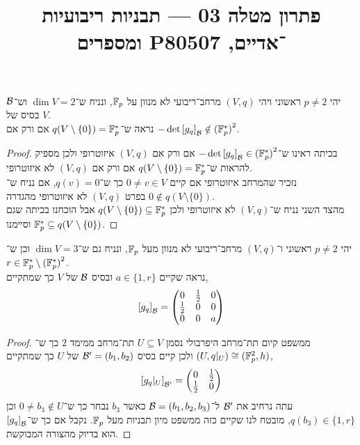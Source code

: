 
\title{פתרון מטלה 03 --- תבניות ריבועיות ומספרים P־אדיים, 80507}

\DeclareMathOperator{\rank}{rank}



\maketitle
\maketitleprint[red]

\question{}
יהי $p \ne 2$ ראשוני ויהי $(V, q)$ מרחב־ריבועי לא מנוון על $\mathbb{F}_p$, ונניח ש־$\dim V = 2$ וש־$\mathcal{B}$ בסיס של $V$. \\
נראה ש־$q(V \setminus \{ 0 \}) = \mathbb{F}_p^*$ אם ורק אם $-\det{[g_q]}_{\mathcal{B}} \notin {(\mathbb{F}_p^*)}^2$.
\begin{proof}
	בכיתה ראינו ש־$- \det {[g_q]}_{\mathcal{B}} \in {(\mathbb{F}_p^*)}^2$ אם ורק אם $(V, q)$ איזוטרופי ולכן מספיק להראות ש־$q(V \setminus \{ 0 \}) = \mathbb{F}_p^*$ אם ורק אם $(V, q)$ לא איזוטרופי. \\
	נזכיר שהמרחב איזוטרופי אם קיים $0 \ne v \in V$ כך ש־$q(v) = 0$, אם נניח ש־$0 \notin q(V \setminus \{ 0 \})$ בפרט $(V, q)$ לא איזוטרופי מהגדרה. \\
	מהצד השני נניח ש־$(V, q)$ לא איזוטרופי ולכן $q(V \setminus \{ 0 \}) \subseteq \mathbb{F}_p^*$ אבל הוכחנו בכיתה שגם $\mathbb{F}_p^* \subseteq q(V \setminus \{ 0 \})$ וסיימנו.
\end{proof}

\question{}
יהי $p \ne 2$ ראשוני ו־$(V, q)$ מרחב־ריבועי לא מנוון מעל $\mathbb{F}_p$, ונניח גם ש־$\dim V = 3$ וכן ש־$r \in \mathbb{F}_p^* \setminus {(\mathbb{F}_p^*)}^2$. \\
נראה שקיים $a \in \{1, r\}$ ובסיס $\mathcal{B}$ של $V$ כך שמתקיים,
\[
	{[g_q]}_{\mathcal{B}}
	= \begin{pmatrix}
		0 & \frac{1}{2} & 0 \\
		\frac{1}{2} & 0 & 0 \\
		0 & 0 & a
	\end{pmatrix}
\]
\begin{proof}
	ממשפט קיום תת־מרחב היפרבולי נסמן $U \subseteq V$ תת־מרחב ממימד $2$ כך ש־$(U, q|_U) \cong (\mathbb{F}_p^2, h)$ ולכן קיים בסיס $\mathcal{B}' = (b_1, b_2)$ של $U$ כך שמתקיים,
	\[
		{[g_q|_U]}_{\mathcal{B}'}
		= \begin{pmatrix}
			0 & \frac{1}{2} \\
			\frac{1}{2} & 0
		\end{pmatrix}
	\]
	עתה נרחיב את $\mathcal{B}'$ ל־$\mathcal{B} = (b_1, b_2, b_3)$ כאשר $b_3$ נבחר כך ש־$0 \ne b_3 \notin U$ וכן $q(b_3) \in \{1, r\}$, מובטח לנו שקיים כזה ממשפט מיון תבניות מעל $\mathbb{F}_p$.
	נקבל אם כך ש־${[g_q]}_{\mathcal{B}}$ הוא בדיוק מהצורה המבוקשת.
\end{proof}

